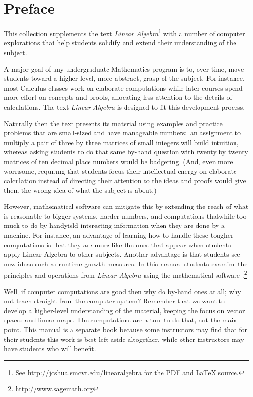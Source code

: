\chapter*{Preface}\pagestyle{preface}\thispagestyle{preface}


This collection supplements the text \nocite{Hefferon12}
\textit{Linear Algebra}\footnote{See \protect\url{http://joshua.smcvt.edu/linearalgebra} for the PDF and \protect\LaTeX{} source.}
with a number of computer explorations that help students
solidify and extend their understanding of the subject.

A major goal of any undergraduate Mathematics program is to,
over time, move students 
toward a higher-level, more abstract, grasp of the subject.
For instance, most Calculus classes work on elaborate computations
while later courses spend more effort on concepts and proofs, allocating 
less attention to the details of calculations.  
The text \textit{Linear Algebra} is designed to fit 
this development process.

Naturally then the text presents its material 
using examples and practice problems
that are small-sized and have manageable numbers:~an 
assignment to multiply a pair of three by three matrices
of small integers will build intuition, whereas asking students to do that same 
by-hand question with twenty by twenty matrices
of ten decimal place numbers would be badgering. 
(And, even more worrisome, requiring that students  
focus their intellectual energy on elaborate calculation instead of directing
their attention to the ideas and proofs would give them the wrong idea of
what the subject is about.)

However, mathematical software can mitigate this by extending the reach of
what is reasonable
to bigger systems, harder numbers, and computations 
that\Dash while too much to do by hand\Dash yield
interesting information when they are done by a machine.
For instance, an advantage of learning how to handle these 
tougher computations is that 
they are more like the ones that appear when students apply Linear 
Algebra to other subjects.
Another advantage is that students see new ideas such as 
runtime growth measures.
In this manual students examine the principles and operations 
from \textit{Linear Algebra} using 
the mathematical software \Sage{}.\footnote{\url{http://www.sagemath.org}}

Well, if computer computations are good then why do by-hand ones at all; why 
not teach straight from the computer system?
Remember that we want to develop a higher-level understanding of the 
material, 
keeping the focus on vector spaces and linear maps.
The computations are a tool to do that, not the main point.
This manual is a separate book because some instructors may find 
that for their students
this work is best left aside altogether, 
while other instructors may have students who
will benefit.


